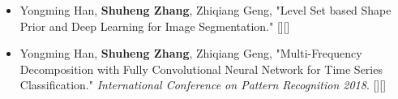 %
%


\begin{itemize}
	\item Yongming Han, \textbf{Shuheng Zhang}, Zhiqiang Geng, "Level Set based Shape Prior and Deep Learning for Image Segmentation." [\href{https://github.com/zsh965866221/LevelSet-ShapePrior-DeepLearning}{\color{blue}{Github}}][\href{https://github.com/zsh965866221/LevelSet-ShapePrior-DeepLearning/raw/master/2018-06-22-Level\%20Set\%20based\%20Shape\%20Prior\%20and\%20Deep\%20Learning\%20for\%20Image\%20Segmentation.pdf}{\color{blue}{{\color{blue}{pdf}}}}] \\
	 { \footnotesize {}}
	\item Yongming Han, \textbf{Shuheng Zhang}, Zhiqiang Geng, "Multi-Frequency Decomposition with Fully Convolutional Neural Network for Time Series Classification." \emph{International Conference on Pattern Recognition 2018}. [\href{https://github.com/zsh965866221/MFD-FCN}{\color{blue}{Github}}][\href{https://github.com/zsh965866221/MFD-FCN/raw/master/MFD-FCN_paper.pdf}{\color{blue}{pdf}}]\\
	 { \footnotesize {}}
\end{itemize}